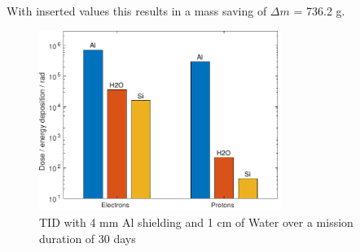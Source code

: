 With inserted values this results in a mass saving of \(\Delta m\) = 736.2 g.

\begin{figure}[htp]
	\centering
	\includegraphics[width=0.7\textwidth]{Media/J_Improvements_Ice}
	\caption{TID with 4 mm Al shielding and 1 cm of Water over a mission duration of 30 days}
	\label{fig:Radiation_Improvements_Ice}
\end{figure}

\cleardoublepage